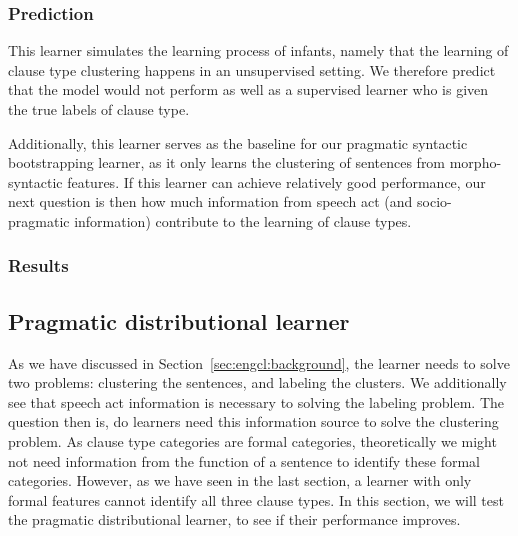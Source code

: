\subsubsection{Prediction} 
\label{sec:engcl:model:baseline:predict}
This learner simulates the learning process of infants, namely that the learning of clause type clustering happens in an unsupervised setting. We therefore predict that the model would not perform as well as a supervised learner who is given the true labels of clause type. 

Additionally, this learner serves as the baseline for our pragmatic syntactic bootstrapping learner, as it only learns the clustering of sentences from morpho-syntactic features. If this learner can achieve relatively good performance, our next question is then how much information from speech act (and socio-pragmatic information) contribute to the learning of clause types.


\subsubsection{Results}
\label{sec:engcl:model:baseline:results}





\subsection{Pragmatic distributional learner}
\label{sec:engcl:model:pragmatics}

As we have discussed in Section~\ref{sec:engcl:background}, the learner needs to solve two problems: clustering the sentences, and labeling the clusters. We additionally see that speech act information is necessary to solving the labeling problem. The question then is, do learners need this information source to solve the clustering problem. As clause type categories are formal categories, theoretically we might not need information from the function of a sentence to identify these formal categories. However, as we have seen in the last section, a learner with only formal features cannot identify all three clause types. In this section, we will test the pragmatic distributional learner, to see if their performance improves.

